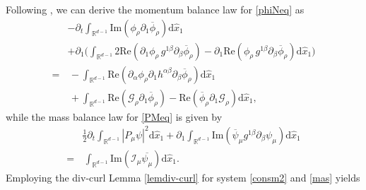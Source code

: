 \documentclass[11pt,letterpaper,reqno]{amsart}
\numberwithin{equation}{section}
\theoremstyle{definition}
\theoremstyle{remark}
\begin{document}
Following \cite{SZ}, we can derive the momentum balance law for \eqref{phiNeq} as
\begin{equation} \label{consm2}\begin{aligned}
		&-\partial_t \int_{\mathbb{R}^{d-1}}  \mathrm{Im}\left( \phi_{\rho } \partial_{1} \overline{\phi}_\rho\right) \mathrm{d} \widehat{x}_1 \\
	&+\partial_{1}\Big(    \int_{\mathbb{R}^{d-1}} 2\mathrm{Re} (\partial_{1} \phi_\rho\,   g^{1\beta} \partial_{\beta} \overline{\phi}_{\rho})-\partial_{1 }\mathrm{Re} ( \phi_\rho\,    g^{1\beta} \partial_{\beta} \overline{\phi}_{\rho} ) \mathrm{d} \widehat{x}_1 \Big)\\
	=&\, -\int_{\mathbb{R}^{d-1}}  \mathrm{Re} (\partial_{\alpha} \phi_\rho   \partial_1 h^{\alpha \beta} \partial_\beta \overline{\phi}_{\rho} )  \mathrm{d} \widehat{x}_1  \\
	&\,  + \int_{\mathbb{R}^{d-1}}  \mathrm{Re} (\mathcal{G}_\rho \partial_{1} \overline{\phi}_\rho) -\mathrm{Re} ( \overline{\phi }_{\rho}\partial_{1} \mathcal{G}_\rho )\mathrm{d} \widehat{x}_1 ,      
\end{aligned}
\end{equation}
while the mass balance law for \eqref{PMeq} is given by 
\begin{equation}\label{mas}
\begin{aligned}
	&\frac 12\partial_t \int_{\mathbb{R}^{d-1}}   \left|P_\mu \psi\right|^2  	\mathrm{d} \widehat{x}_1+  \partial_{1} \int_{\mathbb{R}^{d-1}} \mathrm{Im}(   \overline{ \psi}_\mu g^{1\beta}   \partial_{\beta} \psi_\mu  ) \mathrm{d} \widehat{x}_1  \\
	=&\,\int_{\mathbb{R}^{d-1}} \mathrm{Im} (  \mathcal{I}_\mu  \overline{ \psi_\mu }) \mathrm{d} \widehat{x}_1.
\end{aligned}
\end{equation}
Employing the div-curl Lemma \ref{lemdiv-curl} for system \eqref{consm2} and \eqref{mas} yields
\end{document}
